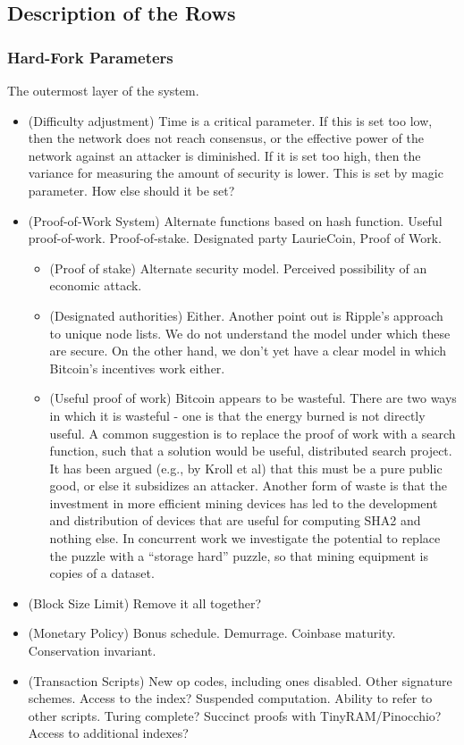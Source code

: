 \subsection{Description of the Rows}

\subsubsection{Hard-Fork Parameters}
The outermost layer of the system.
\begin{itemize}
\item (Difficulty adjustment) Time is a critical parameter. If this is set too low, then the network does not reach consensus, or the effective power of the network against an attacker is diminished. If it is set too high, then the variance for measuring the amount of security is lower. This is set by magic parameter. How else should it be set?
\item (Proof-of-Work System) Alternate functions based on hash function. Useful proof-of-work. Proof-of-stake. Designated party LaurieCoin, Proof of Work. 
  \begin{itemize}
  \item (Proof of stake) Alternate security model. Perceived possibility of an economic attack. 
  \item (Designated authorities) Either. Another point out is Ripple's approach to unique node lists. We do not understand the model under which these are secure. On the other hand, we don't yet have a clear model in which Bitcoin's incentives work either. 
  \item (Useful proof of work) Bitcoin appears to be wasteful. There are two ways in which it is wasteful - one is that the energy burned is not directly useful. A common suggestion is to replace the proof of work with a search function, such that a solution would be useful, distributed search project. It has been argued (e.g., by Kroll et al) that this must be a pure public good, or else it subsidizes an attacker. Another form of waste is that the investment in more efficient mining devices has led to the development and distribution of devices that are useful for computing SHA2 and nothing else. In concurrent work we investigate the potential to replace the puzzle with a ``storage hard'' puzzle, so that mining equipment is copies of a dataset.
    \end{itemize}
\item (Block Size Limit) Remove it all together?
\item (Monetary Policy) Bonus schedule. Demurrage. Coinbase maturity. Conservation invariant.
\item (Transaction Scripts) New op codes, including ones disabled. Other signature schemes. Access to the index? Suspended computation. Ability to refer to other scripts. Turing complete? Succinct proofs with TinyRAM/Pinocchio? Access to additional indexes?
\end{itemize}

